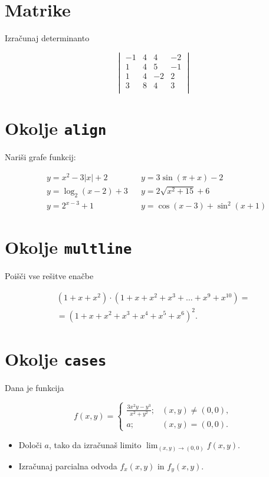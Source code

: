 \documentclass[a4paper,12pt]{article}
\begin{document}
\section*{Matrike}
Izračunaj determinanto
   
   \[
   \begin{vmatrix}
      -1 & 4 & 4 & -2 \\
       1 & 4 & 5 & -1 \\
       1 & 4 & -2 & 2 \\
       3 & 8 & 4 & 3 \\
   \end{vmatrix}
   \]

\section*{Okolje \texttt{align}}
Nariši grafe funkcij:


\begin{align*}
   &y = x^2 - 3|x| + 2  &  &y = 3 \sin(\pi+x) - 2 \\
   &y = \log_2(x-2) + 3 &  &y = 2 \sqrt{x^2+15} + 6 \\
   &y = 2^{x-3} + 1   &    &y = \cos(x-3) + \sin^2(x+1)
\end{align*}


\section*{Okolje \texttt{multline}}
Poišči vse rešitve enačbe


\begin{multline*}
   (1+x+x^2) \cdot (1+x+x^2+x^3+\ldots+x^9+x^{10}) =\\
   =(1+x+x^2+x^3+x^4+x^5+x^6)^2.
\end{multline*}


\section*{Okolje \texttt{cases}}
Dana je funkcija


  \[ 
      f(x,y)=
      \begin{cases}
       \frac{3x^2y-y^3}{x^2+y^2}; & (x,y)\neq(0,0),\\
          a; & (x,y)=(0,0).
       \end{cases}
   \]
\begin{itemize}
\item Določi \(a\), tako da izračunaš limito \( \lim_{(x,y)\to(0,0)} f(x,y) \).
\item Izračunaj parcialna odvoda \(f_x(x,y)\) in \(f_y(x,y)\).
\end{itemize}
\end{document}
